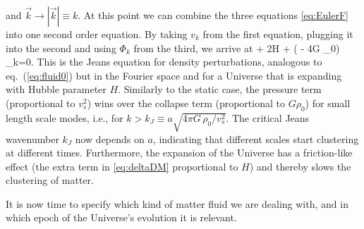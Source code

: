 and $\vec k \to |\vec k| \equiv k$. At this point we can combine the three equations \eqref{eq:EulerF} into one second order equation. By taking $v_k$ from the first equation, plugging it into the second and using $\Phi_k$ from the third, we arrive at 
\beq
\label{eq:deltaDM}
  + 2H  + \left( - 4\pi G \rho_0\right) \delta_k=0. 
\eeq
This is the Jeans equation for density perturbations, analogous to eq.~(\ref{eq:fluid0}) but in the Fourier space and for a  Universe that is expanding with Hubble parameter $H$.
Similarly to the static case, 
the pressure term (proportional to $v_s^2$) wins over the collapse term (proportional to $G \rho_0$) 
for small length scale modes, i.e., for  $k> k_J \equiv a \sqrt{4 \pi G \, \rho_0/v_s^2}$.
The critical Jeans wavenumber $k_J$ now depends on $a$, indicating that different scales start clustering at different times.
Furthermore, the expansion of the Universe 
has a friction-like effect (the extra term in \eqref{eq:deltaDM} proportional to $H$)  and thereby slows the clustering of matter.


\medskip


It is now time to specify which kind of matter fluid we are dealing with, and in which epoch of the Universe's evolution it is relevant. 



